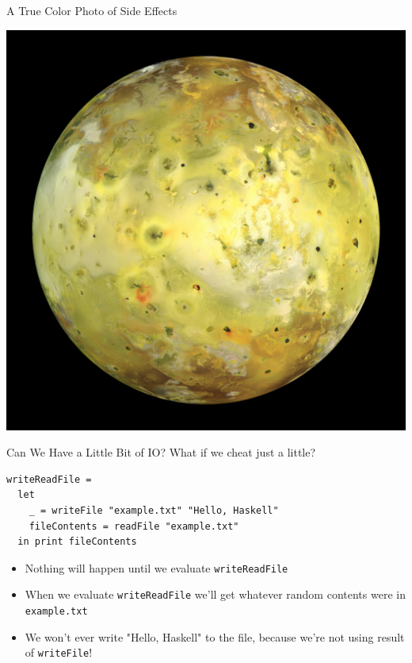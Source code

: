 \documentclass[10pt, presentation, colorlinks]{beamer}
\begin{document}
\begin{frame}[label={sec:orgb933f15}]{A True Color Photo of Side Effects}
\begin{center}
\includegraphics[height=0.6\textheight]{./img/io.jpg}
\end{center}
\end{frame}

\begin{frame}[label={sec:orgf7f04b8},fragile]{Can We Have a Little Bit of IO?}
 What if we cheat just a little?

\bigskip
\pause

\begin{verbatim}
writeReadFile =
  let
    _ = writeFile "example.txt" "Hello, Haskell"
    fileContents = readFile "example.txt"
  in print fileContents
\end{verbatim}

\bigskip

\pause
\begin{itemize}
\item Nothing will happen until we evaluate \texttt{writeReadFile}
\end{itemize}
\pause
\begin{itemize}
\item When we evaluate \texttt{writeReadFile} we'll get whatever random contents were in \texttt{example.txt}
\end{itemize}
\pause
\begin{itemize}
\item We won't ever write \alert{"Hello, Haskell"} to the file, because we're not using result of \texttt{writeFile}!
\end{itemize}
\end{frame}
\end{document}
